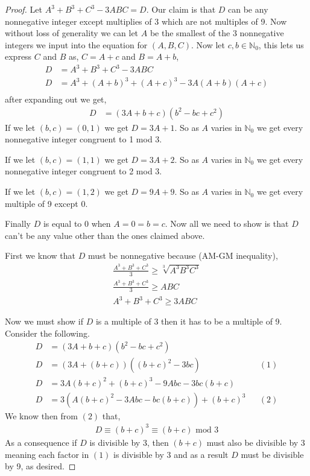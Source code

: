\documentclass[11pt]{article}
\newcommand{\nn}{\mathbb N}   %
\renewcommand{\geq}{\geqslant}
\begin{document}
\begin{proof}
    Let $A^{3} + B^{3} + C^{3} -3ABC = D$. Our claim is that $D$ can be any nonnegative integer except multiplies of 3 which are not multiples of 9. Now without loss of generality we can let $A$ be the smallest of the 3 nonnegative integers we input into the equation for $(A,B,C)$. Now let $c,b \in \nn_0$, this lets us express $C$ and $B$ as, $C = A + c$ and $B = A + b$,
    \begin{align*}
        D &= A^{3} + B^{3} + C^{3} -3ABC  \\
        D &= A^{3} + (A+b)^{3} + (A + c)^{3} - 3A(A+b)(A+c)  \\
    \end{align*}
    after expanding out we get,
    \begin{align*}
        D &= (3A + b + c)(b^{2} -bc + c^{2}) 
    \end{align*}
    If we let $(b,c) = (0,1)$ we get $D = 3A + 1$. So as $A$ varies in $\nn_0$ we get every nonnegative integer congruent to 1 mod 3. 

    If we let $(b,c) = (1,1)$ we get $D = 3A + 2$. So as $A$ varies in $\nn_0$ we get every nonnegative integer congruent to 2 mod 3.

    If we let $(b,c) = (1,2)$ we get $D = 9A + 9$. So as $A$ varies in $\nn_0$ we get every multiple of 9 except 0. 

    Finally $D$ is equal to 0 when $A = 0 = b = c$. Now all we need to show is that $D$ can't be any value other than the ones claimed above. 

    First we know that $D$ must be nonnegative because (AM-GM inequality),
    \begin{align*}
        \frac{A^{3} + B^{3} + C^{3}}{3} \geq \sqrt[3]{A^{3}B^{3}C^{3}} \\
        \frac{A^{3} + B^{3} + C^{3}}{3} \geq  ABC \\
        A^{3} + B^{3} + C^{3} \geq 3ABC
    \end{align*}

    Now we must show if $D$ is a multiple of $3$ then it has to be a multiple of 9. Consider the following. 
    \begin{align*}
        D &= (3A + b + c)(b^{2} - bc + c^{2}) \\
        D &= (3A + (b + c))((b+c)^{2}-3bc) && (1) \\
        D &= 3A(b+c)^{2} + (b+c)^{3} -9Abc -3bc(b+c) \\
        D &= 3(A(b+c)^{2} -3Abc -bc(b+c)) + (b+c)^{3} && (2)
     \end{align*}
     We know then from $(2)$ that,
     \begin{align*}
         D \equiv (b+c)^{3} \equiv (b+c) \text{ mod } 3
     \end{align*}
     As a consequence if $D$ is divisible by 3, then $(b+c)$ must also be divisible by 3 meaning each factor in $(1)$ is divisible by 3 and as a result $D$ must be divisible by 9, as desired.
\end{proof}
\end{document}
